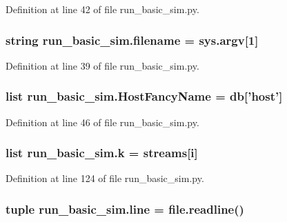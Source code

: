 Definition at line 42 of file run\-\_\-basic\-\_\-sim.\-py.

\hypertarget{namespacerun__basic__sim_a46e83bb8198f44baffa872d1a3b1570f}{
\subsubsection[{filename}]{\setlength{\rightskip}{0pt plus 5cm}string run\-\_\-basic\-\_\-sim.\-filename = sys.\-argv\mbox{[}1\mbox{]}}}\label{namespacerun__basic__sim_a46e83bb8198f44baffa872d1a3b1570f}


Definition at line 39 of file run\-\_\-basic\-\_\-sim.\-py.

\hypertarget{namespacerun__basic__sim_a9ab53f200ea60af8c1febff5dad1e818}{
\subsubsection[{Host\-Fancy\-Name}]{\setlength{\rightskip}{0pt plus 5cm}list run\-\_\-basic\-\_\-sim.\-Host\-Fancy\-Name = {\bf db}\mbox{[}'host'\mbox{]}}}\label{namespacerun__basic__sim_a9ab53f200ea60af8c1febff5dad1e818}


Definition at line 46 of file run\-\_\-basic\-\_\-sim.\-py.

\hypertarget{namespacerun__basic__sim_ab26de909b870c8e4b6e927e4f8973eea}{
\subsubsection[{k}]{\setlength{\rightskip}{0pt plus 5cm}list run\-\_\-basic\-\_\-sim.\-k = {\bf streams}\mbox{[}i\mbox{]}}}\label{namespacerun__basic__sim_ab26de909b870c8e4b6e927e4f8973eea}


Definition at line 124 of file run\-\_\-basic\-\_\-sim.\-py.

\hypertarget{namespacerun__basic__sim_a5d0bbfc63b171c2cc6e2ce7fcdde8ae0}{
\subsubsection[{line}]{\setlength{\rightskip}{0pt plus 5cm}tuple run\-\_\-basic\-\_\-sim.\-line = file.\-readline()}}\label{namespacerun__basic__sim_a5d0bbfc63b171c2cc6e2ce7fcdde8ae0}


